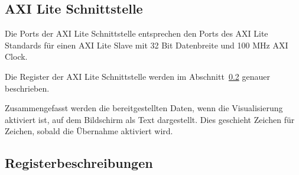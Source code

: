 \subsection{AXI Lite Schnittstelle}

Die Ports der AXI Lite Schnittstelle entsprechen den Ports des AXI Lite Standards für einen AXI Lite Slave mit 32 Bit Datenbreite und 100 MHz AXI Clock.

Die Register der AXI Lite Schnittstelle werden im Abschnitt~\ref{subsec:visual_register} genauer beschrieben.

Zusammengefasst werden die bereitgestellten Daten, wenn die Visualisierung aktiviert ist, auf dem Bildschirm als Text dargestellt.
Dies geschieht Zeichen für Zeichen, sobald die Übernahme aktiviert wird.

\subsection{Registerbeschreibungen}\label{subsec:visual_register}

\begin{registerblock}
     
\end{registerblock}
\begin{registerblock}
    
\end{registerblock}
\begin{registerblock}
    
\end{registerblock}
\begin{registerblock}
    
\end{registerblock}
\begin{registerblock}
    
\end{registerblock}
\begin{registerblock}
    
\end{registerblock}
\begin{registerblock}
    
\end{registerblock}
\begin{registerblock}
    
\end{registerblock}
\begin{registerblock}
    
\end{registerblock}
\begin{registerblock}
    
\end{registerblock}
\begin{registerblock}
    
\end{registerblock}
\begin{registerblock}
    
\end{registerblock}